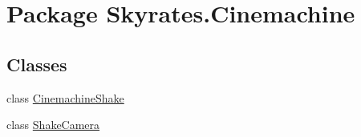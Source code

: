 \hypertarget{namespace_skyrates_1_1_cinemachine}{\section{Package Skyrates.\-Cinemachine}
\label{namespace_skyrates_1_1_cinemachine}
}
\subsection*{Classes}
\begin{DoxyCompactItemize}
\item 
class \hyperlink{class_skyrates_1_1_cinemachine_1_1_cinemachine_shake}{Cinemachine\-Shake}
\item 
class \hyperlink{class_skyrates_1_1_cinemachine_1_1_shake_camera}{Shake\-Camera}
\end{DoxyCompactItemize}
